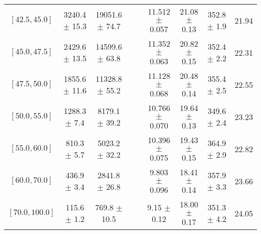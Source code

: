 \begin{tabular}{c||c|c|c|c|c|c|c||c}
$[42.5, 45.0]$ & 3240.4 $\pm$ 15.3 & 19051.6 $\pm$ 74.7 &  &  & 11.512 $\pm$ 0.057 & 21.08 $\pm$ 0.13 & 352.8 $\pm$ 1.9 & 21.94\\
$[45.0, 47.5]$ & 2429.6 $\pm$ 13.5 & 14599.6 $\pm$ 63.8 &  &  & 11.352 $\pm$ 0.063 & 20.82 $\pm$ 0.15 & 352.4 $\pm$ 2.2 & 22.31\\
$[47.5, 50.0]$ & 1855.6 $\pm$ 11.6 & 11328.8 $\pm$ 55.2 &  &  & 11.128 $\pm$ 0.068 & 20.48 $\pm$ 0.14 & 355.4 $\pm$ 2.5 & 22.55\\
$[50.0, 55.0]$ & 1288.3 $\pm$ 7.4 & 8179.1 $\pm$ 39.2 &  &  & 10.766 $\pm$ 0.070 & 19.64 $\pm$ 0.13 & 349.6 $\pm$ 2.4 & 23.23\\
$[55.0, 60.0]$ & 810.3 $\pm$ 5.7 & 5023.2 $\pm$ 32.2 &  &  & 10.396 $\pm$ 0.075 & 19.43 $\pm$ 0.15 & 364.9 $\pm$ 2.9 & 22.82\\
$[60.0, 70.0]$ & 436.9 $\pm$ 3.4 & 2841.8 $\pm$ 26.8 &  &  & 9.803 $\pm$ 0.096 & 18.41 $\pm$ 0.14 & 357.9 $\pm$ 3.3 & 23.66\\
$[70.0, 100.0]$ & 115.6 $\pm$ 1.2 & 769.8 $\pm$ 10.5 &  &  & 9.15 $\pm$ 0.12 & 18.00 $\pm$ 0.17 & 351.3 $\pm$ 4.2 & 24.05\\
\end{tabular}
